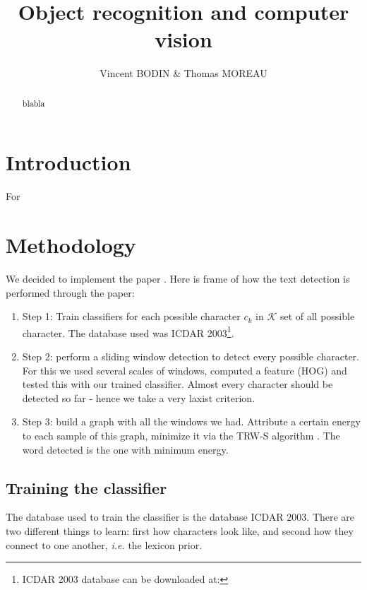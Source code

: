 \documentclass[10pt,a4paper]{article}
\title{Object recognition and computer vision}
\author{Vincent BODIN \& Thomas MOREAU}
\begin{document}
\maketitle

\hrulefill
\vspace{2cm}
\begin{abstract}
blabla
\end{abstract}



\newpage
\tableofcontents
\newpage
\section*{Introduction}

For 


\section{Methodology}

We decided to implement the paper \cite{Mis}. Here is frame of how the text detection is performed through the paper:
\begin{enumerate}
\item Step 1: Train classifiers for each possible character $c_k$ in $\mathcal{K}$ set of all possible character. The database used was ICDAR 2003\footnote{ICDAR 2003 database can be downloaded at: }.
\item Step 2: perform a sliding window detection to detect every possible character. For this we used several scales of windows, computed a feature (HOG) and tested this with our trained classifier. Almost every character should be detected so far - hence we take a very laxist criterion.
\item Step 3: build a graph with all the windows we had. Attribute a certain energy to each sample of this graph, minimize it via the TRW-S algorithm \cite{Kol}. The word detected is the one with minimum energy.
\end{enumerate}

\subsection{Training the classifier}

The database used to train the classifier is the database ICDAR 2003. There are two different things to learn: first how characters look like, and second how they connect to one another, \emph{i.e.} the lexicon prior.
\end{document}
